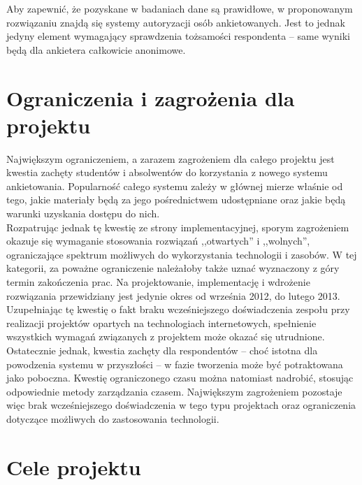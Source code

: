 Aby zapewnić, że pozyskane w badaniach dane są prawidłowe, w proponowanym rozwiązaniu znajdą się systemy autoryzacji osób ankietowanych. Jest to jednak jedyny element wymagający sprawdzenia tożsamości respondenta -- same wyniki będą dla ankietera całkowicie anonimowe. \\

\section{Ograniczenia i zagrożenia dla projektu}
\label{Chapter12}

Największym ograniczeniem, a zarazem zagrożeniem dla całego projektu jest kwestia zachęty studentów i absolwentów do korzystania z nowego systemu ankietowania. Popularność całego systemu zależy w głównej mierze właśnie od tego, jakie materiały będą za jego pośrednictwem udostępniane oraz jakie będą warunki uzyskania dostępu do nich. \\

Rozpatrując jednak tę kwestię ze strony implementacyjnej, sporym zagrożeniem okazuje się wymaganie stosowania rozwiązań ,,otwartych'' i ,,wolnych'', ograniczające spektrum możliwych do wykorzystania technologii i zasobów. W tej kategorii, za poważne ograniczenie należałoby także uznać wyznaczony z góry termin zakończenia prac. Na projektowanie, implementację i wdrożenie rozwiązania przewidziany jest jedynie okres od września 2012, do lutego 2013. Uzupełniając tę kwestię o fakt braku wcześniejszego doświadczenia zespołu przy realizacji projektów opartych na technologiach internetowych, spełnienie wszystkich wymagań związanych z projektem może okazać się utrudnione. \\

Ostatecznie jednak, kwestia zachęty dla respondentów -- choć istotna dla powodzenia systemu w przyszłości -- w fazie tworzenia może być potraktowana jako poboczna. Kwestię ograniczonego czasu można natomiast nadrobić, stosując odpowiednie metody zarządzania czasem. Największym zagrożeniem pozostaje więc brak wcześniejszego doświadczenia w tego typu projektach oraz ograniczenia dotyczące możliwych do zastosowania technologii. \\

\section{Cele projektu}
\label{Chapter13}

